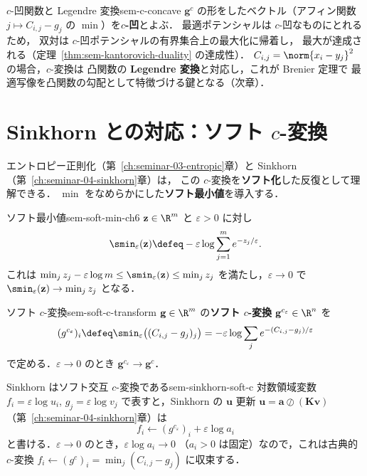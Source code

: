\begin{remark}{$c$-凹関数と Legendre 変換}{sem-c-concave}
  $\mathbf{g}^c$ の形をしたベクトル（アフィン関数
  $j \mapsto C_{i,j} - g_j$ の $\min$）を\textbf{$c$-凹}とよぶ．
  最適ポテンシャルは $c$-凹なものにとれるため，
  双対は $c$-凹ポテンシャルの有界集合上の最大化に帰着し，
  最大が達成される（定理~\ref{thm:sem-kantorovich-duality} の達成性）．
  $C_{i,j} = \norm{x_i - y_j}^2$ の場合，$c$-変換は
  凸関数の \textbf{Legendre 変換}と対応し，これが Brenier 定理で
  最適写像を凸関数の勾配として特徴づける鍵となる（次章）．
\end{remark}

\section{Sinkhorn との対応：ソフト \texorpdfstring{$c$}{c}-変換}
\label{sec:sem-soft-c-transform}

エントロピー正則化（第~\ref{ch:seminar-03-entropic}章）と
Sinkhorn（第~\ref{ch:seminar-04-sinkhorn}章）は，
この $c$-変換を\textbf{ソフト化}した反復として理解できる．
$\min$ をなめらかにした\textbf{ソフト最小値}を導入する．

\begin{definition}{ソフト最小値}{sem-soft-min-ch6}
  $\mathbf{z} \in \R^m$ と $\varepsilon > 0$ に対し
  \[
    \smin_\varepsilon(\mathbf{z})
    \defeq
    -\varepsilon \log \sum_{j=1}^m e^{-z_j/\varepsilon}.
  \]
  これは $\min_j z_j - \varepsilon\log m \leq \smin_\varepsilon(\mathbf{z})
  \leq \min_j z_j$ を満たし，$\varepsilon \to 0$ で
  $\smin_\varepsilon(\mathbf{z}) \to \min_j z_j$ となる．
\end{definition}

\begin{definition}{ソフト $c$-変換}{sem-soft-c-transform}
  $\mathbf{g} \in \R^m$ の\textbf{ソフト $c$-変換}
  $\mathbf{g}^{c_\varepsilon} \in \R^n$ を
  \[
    (g^{c_\varepsilon})_i
    \defeq
    \smin_\varepsilon\bigl((C_{i,j} - g_j)_j\bigr)
    = -\varepsilon \log \sum_j e^{-(C_{i,j} - g_j)/\varepsilon}
  \]
  で定める．$\varepsilon \to 0$ のとき $\mathbf{g}^{c_\varepsilon} \to \mathbf{g}^c$．
\end{definition}

\begin{proposition}{Sinkhorn はソフト交互 $c$-変換である}{sem-sinkhorn-soft-c}
  対数領域変数 $f_i = \varepsilon\log u_i$, $g_j = \varepsilon\log v_j$
  で表すと，Sinkhorn の $\mathbf{u}$ 更新
  $\mathbf{u} = \mathbf{a} \oslash (\mathbf{K}\mathbf{v})$
  （第~\ref{ch:seminar-04-sinkhorn}章）は
  \[
    f_i \leftarrow (g^{c_\varepsilon})_i + \varepsilon\log a_i
  \]
  と書ける．$\varepsilon \to 0$ のとき，$\varepsilon\log a_i \to 0$
  （$a_i > 0$ は固定）なので，これは古典的 $c$-変換
  $f_i \leftarrow (g^c)_i = \min_j(C_{i,j} - g_j)$ に収束する．
\end{proposition}

